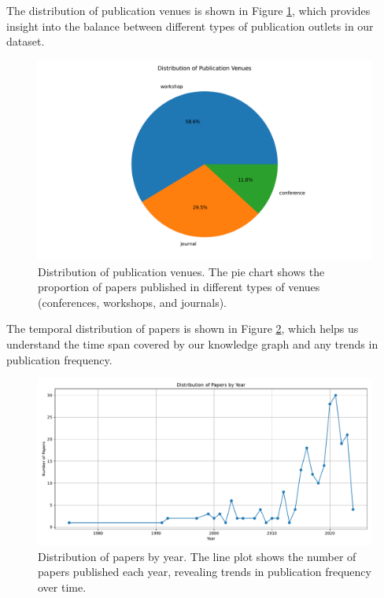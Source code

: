 \documentclass[10pt,a4paper]{article}
\begin{document}
The distribution of publication venues is shown in Figure \ref{fig:venue_dist}, which provides insight into the balance between different types of publication outlets in our dataset.

\begin{figure}[H]
    \centering
    \includegraphics[width=\textwidth]{img/venue_distribution.pdf}
    \caption{Distribution of publication venues. The pie chart shows the proportion of papers published in different types of venues (conferences, workshops, and journals).}
    \label{fig:venue_dist}
\end{figure}

The temporal distribution of papers is shown in Figure \ref{fig:year_dist}, which helps us understand the time span covered by our knowledge graph and any trends in publication frequency.

\begin{figure}[H]
    \centering
    \includegraphics[width=\textwidth]{img/year_distribution.pdf}
    \caption{Distribution of papers by year. The line plot shows the number of papers published each year, revealing trends in publication frequency over time.}
    \label{fig:year_dist}
\end{figure}
\end{document}
